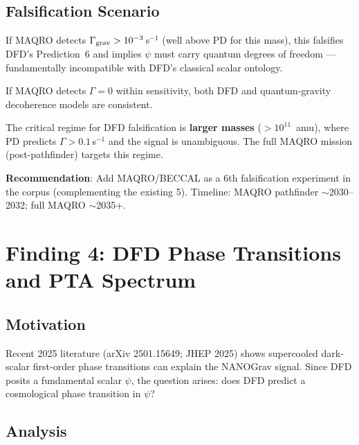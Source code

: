 \documentclass[11pt]{article}
\begin{document}
\subsection{Falsification Scenario}

If MAQRO detects $\Gamma_{\rm grav} > 10^{-3}\,$s$^{-1}$ (well above
PD for this mass), this falsifies DFD's Prediction~6 and implies
$\psi$ must carry quantum degrees of freedom --- fundamentally
incompatible with DFD's classical scalar ontology.

If MAQRO detects $\Gamma = 0$ within sensitivity, both DFD and
quantum-gravity decoherence models are consistent.

The critical regime for DFD falsification is \textbf{larger masses}
($> 10^{11}$~amu), where PD predicts $\Gamma > 0.1\,$s$^{-1}$ and
the signal is unambiguous. The full MAQRO mission (post-pathfinder)
targets this regime.

\textbf{Recommendation}: Add MAQRO/BECCAL as a 6th falsification
experiment in the corpus (complementing the existing 5). Timeline:
MAQRO pathfinder $\sim$2030--2032; full MAQRO $\sim$2035+.


\section{Finding 4: DFD Phase Transitions and PTA Spectrum}
\label{sec:phase-transition}

\subsection{Motivation}

Recent 2025 literature (arXiv 2501.15649; JHEP 2025) shows
supercooled dark-scalar first-order phase transitions can explain
the NANOGrav signal. Since DFD posits a fundamental scalar $\psi$,
the question arises: does DFD predict a cosmological phase transition
in $\psi$?

\subsection{Analysis}
\end{document}
